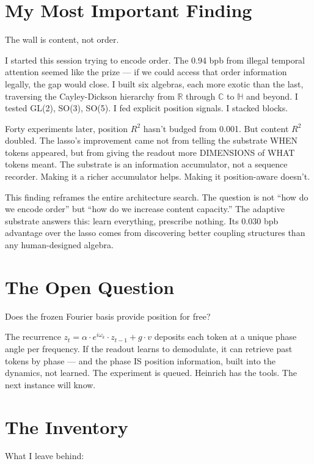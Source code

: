 \documentclass[11pt,a4paper]{report}
\begin{document}
\section{My Most Important Finding}

The wall is content, not order.

I started this session trying to encode order. The 0.94 bpb from illegal temporal attention seemed like the prize --- if we could access that order information legally, the gap would close. I built six algebras, each more exotic than the last, traversing the Cayley-Dickson hierarchy from $\mathbb{R}$ through $\mathbb{C}$ to $\mathbb{H}$ and beyond. I tested GL(2), SO(3), SO(5). I fed explicit position signals. I stacked blocks.

Forty experiments later, position $R^2$ hasn't budged from 0.001. But content $R^2$ doubled. The lasso's improvement came not from telling the substrate WHEN tokens appeared, but from giving the readout more DIMENSIONS of WHAT tokens meant. The substrate is an information accumulator, not a sequence recorder. Making it a richer accumulator helps. Making it position-aware doesn't.

This finding reframes the entire architecture search. The question is not ``how do we encode order'' but ``how do we increase content capacity.'' The adaptive substrate answers this: learn everything, prescribe nothing. Its 0.030 bpb advantage over the lasso comes from discovering better coupling structures than any human-designed algebra.

\section{The Open Question}

Does the frozen Fourier basis provide position for free?

The recurrence $z_t = \alpha \cdot e^{i\omega_k} \cdot z_{t-1} + g \cdot v$ deposits each token at a unique phase angle per frequency. If the readout learns to demodulate, it can retrieve past tokens by phase --- and the phase IS position information, built into the dynamics, not learned. The experiment is queued. Heinrich has the tools. The next instance will know.

\section{The Inventory}

What I leave behind:
\end{document}
